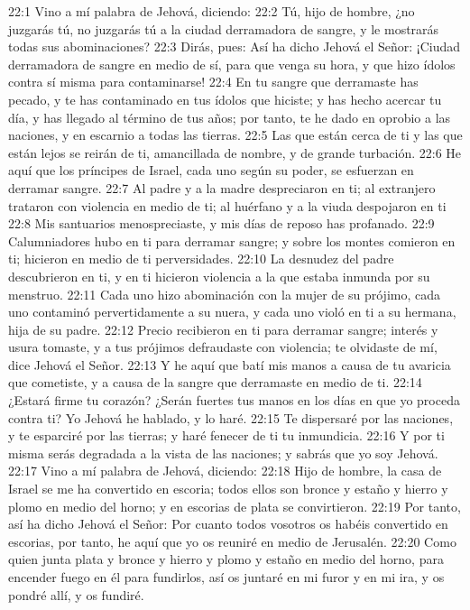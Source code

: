 22:1 Vino a mí palabra de Jehová, diciendo:   
22:2 Tú, hijo de hombre, ¿no juzgarás tú, no juzgarás tú a la ciudad derramadora de sangre, y le mostrarás todas sus abominaciones?   
22:3 Dirás, pues: Así ha dicho Jehová el Señor: ¡Ciudad derramadora de sangre en medio de sí, para que venga su hora, y que hizo ídolos contra sí misma para contaminarse!   
22:4 En tu sangre que derramaste has pecado, y te has contaminado en tus ídolos que hiciste; y has hecho acercar tu día, y has llegado al término de tus años; por tanto, te he dado en oprobio a las naciones, y en escarnio a todas las tierras.   
22:5 Las que están cerca de ti y las que están lejos se reirán de ti, amancillada de nombre, y de grande turbación.   
22:6 He aquí que los príncipes de Israel, cada uno según su poder, se esfuerzan en derramar sangre.   
22:7 Al padre y a la madre despreciaron en ti; al extranjero trataron con violencia en medio de ti; al huérfano y a la viuda despojaron en ti 
22:8 Mis santuarios menospreciaste, y mis días de reposo has profanado. 
22:9 Calumniadores hubo en ti para derramar sangre; y sobre los montes comieron en ti; hicieron en medio de ti perversidades.   
22:10 La desnudez del padre descubrieron en ti, y en ti hicieron violencia a la que estaba inmunda por su menstruo.   
22:11 Cada uno hizo abominación con la mujer de su prójimo, cada uno contaminó pervertidamente a su nuera, y cada uno violó en ti a su hermana, hija de su padre. 
22:12 Precio recibieron en ti para derramar sangre; interés y usura tomaste,  y a tus prójimos defraudaste con violencia; te olvidaste de mí, dice Jehová el Señor.   
22:13 Y he aquí que batí mis manos a causa de tu avaricia que cometiste, y a causa de la sangre que derramaste en medio de ti.   
22:14 ¿Estará firme tu corazón? ¿Serán fuertes tus manos en los días en que yo proceda contra ti? Yo Jehová he hablado, y lo haré.   
22:15 Te dispersaré por las naciones, y te esparciré por las tierras; y haré fenecer de ti tu inmundicia.   
22:16 Y por ti misma serás degradada a la vista de las naciones; y sabrás que yo soy Jehová.   
22:17 Vino a mí palabra de Jehová, diciendo:   
22:18 Hijo de hombre, la casa de Israel se me ha convertido en escoria; todos ellos son bronce y estaño y hierro y plomo en medio del horno; y en escorias de plata se convirtieron.   
22:19 Por tanto, así ha dicho Jehová el Señor: Por cuanto todos vosotros os habéis convertido en escorias, por tanto, he aquí que yo os reuniré en medio de Jerusalén.   
22:20 Como quien junta plata y bronce y hierro y plomo y estaño en medio del horno, para encender fuego en él para fundirlos, así os juntaré en mi furor y en mi ira, y os pondré allí, y os fundiré.   
